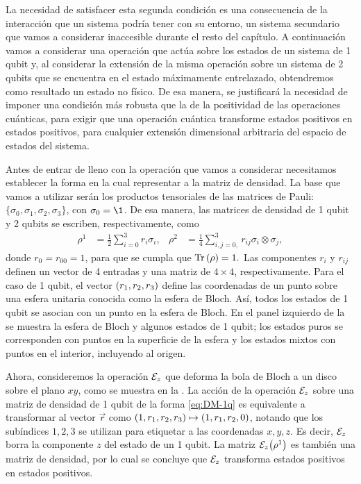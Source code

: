 La necesidad de satisfacer esta segunda condición
es una consecuencia de la interacción que un sistema podría tener
con su entorno, un sistema secundario que vamos 
a considerar inaccesible durante el resto del capítulo.
A continuación vamos a considerar una operación 
que actúa sobre los estados de un sistema de
1 qubit y, al considerar la extensión de la misma operación
sobre un sistema de 2 qubits que se encuentra en
el estado máximamente entrelazado,
obtendremos como resultado un estado no físico.
De esa manera, se justificará la necesidad de imponer 
una condición más robusta que la de la positividad 
de las operaciones cuánticas, para exigir 
que una operación cuántica transforme estados 
positivos en estados positivos, para cualquier
extensión dimensional arbitraria del espacio
de estados del sistema.

Antes de entrar de lleno con la operación que vamos 
a considerar necesitamos establecer la forma en la 
cual representar a la matriz de densidad. La base
que vamos a utilizar serán los productos tensoriales de
las matrices de Pauli: $\{ \sigma_0, \sigma_1, \sigma_2, \sigma_3\}$,
con $\sigma_0=\1$. De esa manera, las matrices de 
densidad de 1 qubit y 2 qubits se escriben, 
respectivamente, como~\cite{nielsen_chuang_2011}
\begin{align}
\rho^1&=\frac{1}{2}\sum_{i=0}^{3} r_i\sigma_i,
& 
\rho^2&=\frac{1}{4}\sum _{i,j=0, }^{3}r_{ij}\sigma_i\otimes\sigma_j,
\label{eq:DM-1q}
\end{align}
donde $r_0=r_{00}=1$, para que se cumpla que $\Tr\qty(\rho)=1.$
Las componentes $r_i$ y $r_{ij}$ definen un vector de 4 entradas
y una matriz de $4\times4$, respectivamente. 
Para el caso de 1 qubit, el vector $\qty(r_1, r_2, r_3)$ define 
las coordenadas de un punto sobre una esfera unitaria conocida
como la esfera de Bloch.
Así, todos los estados de 1 qubit se asocian con un punto en la
esfera de Bloch. En el panel izquierdo de la 
 se muestra la esfera de Bloch
y algunos estados de 1 qubit; los estados puros se corresponden
con puntos en la superficie de la esfera y los estados mixtos 
con puntos en el interior, incluyendo al origen.

Ahora, consideremos la operación $\mathcal{E}_z$ que deforma la bola de Bloch a un 
disco sobre el plano $xy$, como se muestra en la . 
La acción de la operación $\mathcal{E}_z$ sobre una matriz de densidad
de 1 qubit 
de la forma \eqref{eq:DM-1q} es equivalente a 
transformar al vector $\vec{r}$ como 
$\qty(1,r_1,r_2,r_3)\mapsto\qty(1,r_1,r_2,0)$,
notando que los subíndices $1,2,3$ se utilizan para
etiquetar a las coordenadas $x,y,z$. 
Es decir, $\mathcal{E}_z$ borra la componente $z$ del estado de un 1 qubit.
La matriz $\mathcal{E}_z\qty(\rho^1)$ es también una matriz de densidad, 
por lo cual se concluye que $\mathcal{E}_z$ transforma estados 
positivos en estados positivos.

